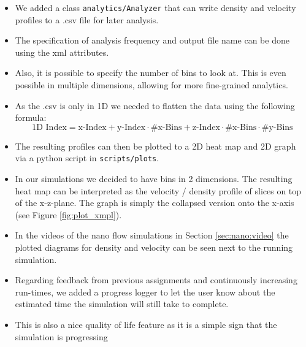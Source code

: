 \documentclass{article}
\begin{document}
    \begin{itemize}
        \item We added a class \texttt{analytics/Analyzer} that can write density and velocity profiles to a .csv file for later analysis.
        \item The specification of analysis frequency and output file name can be done using the xml attributes.
        \item Also, it is possible to specify the number of bins to look at. This is even possible in multiple dimensions, allowing for more fine-grained analytics.
        \item As the .csv is only in 1D we needed to flatten the data using the following formula:
        \[
        \text{1D Index} = \text{x-Index} + \text{y-Index} \cdot \text{\#x-Bins} + \text{z-Index} \cdot \text{\#x-Bins} \cdot \text{\#y-Bins}
        \]
        \item The resulting profiles can then be plotted to a 2D heat map and 2D graph via a python script in \texttt{scripts/plots}.
        \item In our simulations we decided to have bins in 2 dimensions. The resulting heat map can be interpreted as the velocity / density profile of slices on top of the x-z-plane. The graph is simply the collapsed version onto the x-axis (see Figure \ref{fig:plot_xmpl}).
        \item In the videos of the nano flow simulations in Section \ref{sec:nano:video} the plotted diagrams for density and velocity can be seen next to the running simulation.
        \item Regarding feedback from previous assignments and continuously increasing run-times, we added a progress logger to let the user know about the estimated time the simulation will still take to complete.
        \item This is also a nice quality of life feature as it is a simple sign that the simulation is progressing
    \end{itemize}
\end{document}
